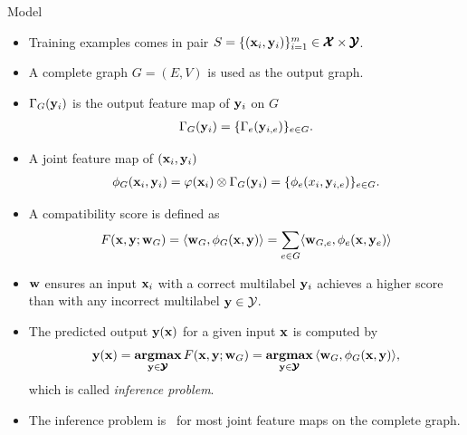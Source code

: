 \documentclass[first=dgreen,second=purple,logo=yellowexc]{aaltoslides}
\begin{document}
%
\begin{frame}[allowframebreaks]{Model}
	\begin{itemize}
		\item Training examples comes in pair $S=\{(\mathbf {x}_i,\mathbf {y}_i)\}_{i=1}^{m}\in\pmb {\mathcal{X}}\times\pmb {\mathcal{Y}}$.
		\item A complete graph $G=(E,V)$ is used as the output graph.
		\item $\Gamma_G(\mathbf {y}_i)$ is the output feature map of $\mathbf {y}_i$ on $G$
		\begin{align*}
			\Gamma_G(\mathbf {y}_i) = \{\Gamma_e(\mathbf {y}_{i,e})\}_{e\in G}.
		\end{align*}
		\item A joint feature map of $(\mathbf {x}_i,\mathbf {y}_i)$
		\begin{align*}
			\phi_G(\mathbf {x}_i,\mathbf {y}_i) = \varphi(\mathbf {x}_i)\otimes\Gamma_G(\mathbf {y}_i) = \{\phi_e(x_i,\mathbf {y}_{i,e})\}_{e\in G}.
		\end{align*}
		\item A compatibility score is defined as
		\begin{align*}
			F(\mathbf {x},\mathbf {y};\mathbf {w}_G) = \langle \mathbf {w}_G, \phi_G(\mathbf {x},\mathbf {y}) \rangle=\sum_{e\in G}\langle \mathbf {w}_{G,e}, \phi_e(\mathbf {x},\mathbf {y}_{e}) \rangle
		\end{align*} 
		\item $\mathbf {w}$ ensures an input $\mathbf {x}_i$ with a correct multilabel $\mathbf {y}_i$ achieves a higher score than with any incorrect multilabel $\mathbf {y}\in\mathcal{Y}$.
		\item The predicted output $\mathbf {y}(\mathbf {x})$ for a given input $\mathbf {x}$ is computed by
		\begin{align*}
			\mathbf {y}(\mathbf {x}) = \underset{\mathbf {y}\in\pmb {\mathcal{Y}}}{\textbf{argmax}}\,F(\mathbf {x},\mathbf {y};\mathbf {w}_G) = \underset{\mathbf {y}\in\pmb {\mathcal{Y}}}{\textbf{argmax}}\,\langle \mathbf {w}_G, \phi_G(\mathbf {x},\mathbf {y}) \rangle,
		\end{align*}
		which is called \textit{inference problem}.
		\item The {inference problem} is \nphard\ for most joint feature maps on the complete graph.
	\end{itemize}
\end{frame}
\end{document}
